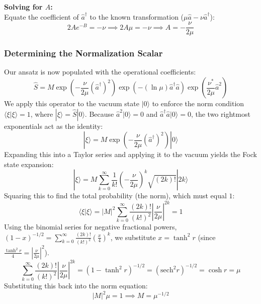 \textbf{Solving for $A$:} \\
Equate the coefficient of $\hat{a}^\dagger$ to the known transformation ($\mu\hat{a} - \nu\hat{a}^\dagger$):
\begin{equation*}
2Ae^{-B} = -\nu \implies 2A\mu = -\nu \implies A = -\frac{\nu}{2\mu}
\end{equation*}

\subsubsection{Determining the Normalization Scalar}
Our ansatz is now populated with the operational coefficients:
\begin{equation*}
\hat{S} = M \exp\left(-\frac{\nu}{2\mu}(\hat{a}^\dagger)^2\right) \exp\left(-(\ln\mu)\hat{a}^\dagger\hat{a}\right) \exp\left(\frac{\nu^*}{2\mu}\hat{a}^2\right)
\end{equation*}
We apply this operator to the vacuum state $|0\rangle$ to enforce the norm condition $\langle \xi | \xi \rangle = 1$, where $|\xi\rangle = \hat{S}|0\rangle$. Because $\hat{a}^2|0\rangle = 0$ and $\hat{a}^\dagger\hat{a}|0\rangle = 0$, the two rightmost exponentials act as the identity:
\begin{equation*}
|\xi\rangle = M \exp\left(-\frac{\nu}{2\mu}(\hat{a}^\dagger)^2\right)|0\rangle
\end{equation*}
Expanding this into a Taylor series and applying it to the vacuum yields the Fock state expansion:
\begin{equation*}
|\xi\rangle = M \sum_{k=0}^{\infty} \frac{1}{k!} \left(-\frac{\nu}{2\mu}\right)^k \sqrt{(2k)!} |2k\rangle
\end{equation*}
Squaring this to find the total probability (the norm), which must equal $1$:
\begin{equation*}
\langle \xi | \xi \rangle = |M|^2 \sum_{k=0}^{\infty} \frac{(2k)!}{(k!)^2} \left|\frac{\nu}{2\mu}\right|^{2k} = 1
\end{equation*}
Using the binomial series for negative fractional powers, $(1 - x)^{-1/2} = \sum_{k=0}^{\infty} \frac{(2k)!}{(k!)^2} \left(\frac{x}{4}\right)^k$, we substitute $x = \tanh^2 r$ (since $\frac{\tanh^2 r}{4} = \left|\frac{\nu}{2\mu}\right|^2$).
\begin{equation*}
\sum_{k=0}^{\infty} \frac{(2k)!}{(k!)^2} \left|\frac{\nu}{2\mu}\right|^{2k} = (1 - \tanh^2 r)^{-1/2} = (\text{sech}^2 r)^{-1/2} = \cosh r = \mu
\end{equation*}
Substituting this back into the norm equation:
\begin{equation*}
|M|^2 \mu = 1 \implies M = \mu^{-1/2}
\end{equation*}


